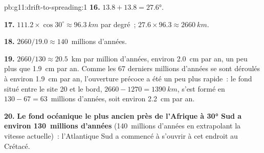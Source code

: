 \begin{solution}{pb:g11:drift-to-spreading:1}
\textbf{16.} $13.8 + 13.8 = \ang{27.6}$.

\textbf{17.} $111.2 \times \cos 30^\circ \approx \qty{96.3}{km}$ par
degré~; $27.6 \times 96.3 \approx \qty{2660}{km}$.

\textbf{18.} $2660/19.0 \approx 140$~millions d'années.

\textbf{19.} $2660/130 \approx \num{20.5}$~km par million d'années, environ
\qty{2.0}{cm} par an, un peu plus que \qty{1.9}{cm} par an. Comme les
67 derniers millions d'années se sont déroulés à environ \qty{1.9}{cm} par
an, l'ouverture précoce a été un peu plus rapide~: le fond situé entre le
site 20 et le bord, $2660 - 1270 =
\qty{1390}{km}$, s'est formé en $130 - 67 = 63$~millions d'années, soit
environ \qty{2.2}{cm} par an.

\textbf{20.} \textbf{Le fond océanique le plus ancien près de l'Afrique à
\ang{30} Sud a environ 130~millions d'années} (140~millions d'années en
extrapolant la vitesse actuelle)~: l'Atlantique Sud a commencé à s'ouvrir à
cet endroit au Crétacé.
\end{solution}
